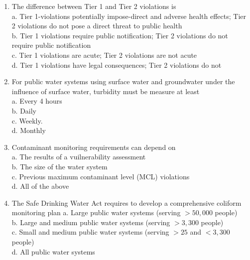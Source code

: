 \begin{enumerate}
\item The difference between Tier 1 and Tier 2 violations is\\
a. Tier 1-violations potentially impose-direct and adverse health effects; Tier 2 violations do not pose a direct threat to public health\\
b. Tier 1 violations require public notification; Tier 2 violations do not require public notification\\
c. Tier 1 violations are acute; Tier 2 violations are not acute\\
d. Tier 1 violations have legal consequences; Tier 2 violations do not\\


\item For public water systems using surface water and groundwater under the influence of surface water, turbidity must be measure at least\\
a. Every 4 hours\\
b. Daily\\
c. Weekly.\\
d. Monthly\\

\item Contaminant monitoring requirements can depend on\\
a. The results of a vuilnerability assessment\\
b. The size of the water system\\
c. Previous maximum contaminant level (MCL) violations\\
d. All of the above\\

\item The Safe Drinking Water Act requires to develop a comprehensive coliform monitoring plan
a. Large public water systems (serving $>50,000$ people)\\
b. Large and medium public water systems (serving $>3,300$ people)\\
c. Small and medium public water systems (serving $>25$ and $<3,300$ people)\\
d. All public water systems\\






\end{enumerate}

